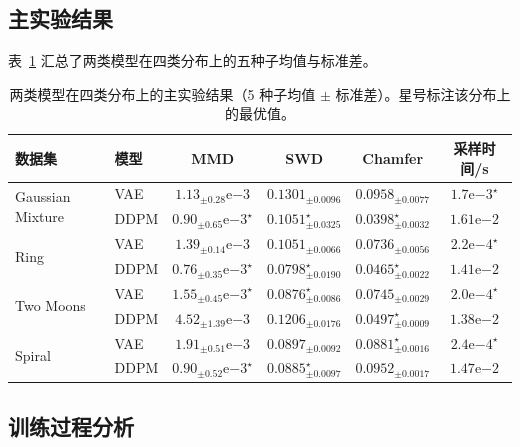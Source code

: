 \documentclass[UTF8,a4paper,12pt]{ctexart}
\begin{document}
\subsection{主实验结果}

表~\ref{tab:main-results} 汇总了两类模型在四类分布上的五种子均值与标准差。

\begin{table}[H]
\centering
\footnotesize
\caption{两类模型在四类分布上的主实验结果（5 种子均值 $\pm$ 标准差）。星号标注该分布上的最优值。}
\label{tab:main-results}
\begin{tabular}{llcccc}
\toprule
数据集 & 模型 & MMD  & SWD  & Chamfer  & 采样时间/s \\
\midrule
\multirow{2}{*}{Gaussian Mixture}
    & VAE    & $1.13_{\pm 0.28}\mathrm{e}{-3}$ & $0.1301_{\pm 0.0096}$ & $0.0958_{\pm 0.0077}$ & $\mathbf{1.7}\mathrm{e}{-3}^\star$ \\
    & DDPM   & $\mathbf{0.90}_{\pm 0.65}\mathrm{e}{-3}^\star$ & $\mathbf{0.1051}_{\pm 0.0325}^\star$ & $\mathbf{0.0398}_{\pm 0.0032}^\star$ & $1.61\mathrm{e}{-2}$ \\
\midrule
\multirow{2}{*}{Ring}
    & VAE    & $1.39_{\pm 0.14}\mathrm{e}{-3}$ & $0.1051_{\pm 0.0066}$ & $0.0736_{\pm 0.0056}$ & $\mathbf{2.2}\mathrm{e}{-4}^\star$ \\
    & DDPM   & $\mathbf{0.76}_{\pm 0.35}\mathrm{e}{-3}^\star$ & $\mathbf{0.0798}_{\pm 0.0190}^\star$ & $\mathbf{0.0465}_{\pm 0.0022}^\star$ & $1.41\mathrm{e}{-2}$ \\
\midrule
\multirow{2}{*}{Two Moons}
    & VAE    & $\mathbf{1.55}_{\pm 0.45}\mathrm{e}{-3}^\star$ & $\mathbf{0.0876}_{\pm 0.0086}^\star$ & $0.0745_{\pm 0.0029}$ & $\mathbf{2.0}\mathrm{e}{-4}^\star$ \\
    & DDPM   & $4.52_{\pm 1.39}\mathrm{e}{-3}$ & $0.1206_{\pm 0.0176}$ & $\mathbf{0.0497}_{\pm 0.0009}^\star$ & $1.38\mathrm{e}{-2}$ \\
\midrule
\multirow{2}{*}{Spiral}
    & VAE    & $1.91_{\pm 0.51}\mathrm{e}{-3}$ & $0.0897_{\pm 0.0092}$ & $\mathbf{0.0881}_{\pm 0.0016}^\star$ & $\mathbf{2.4}\mathrm{e}{-4}^\star$ \\
    & DDPM   & $\mathbf{0.90}_{\pm 0.52}\mathrm{e}{-3}^\star$ & $\mathbf{0.0885}_{\pm 0.0097}^\star$ & $0.0952_{\pm 0.0017}$ & $1.47\mathrm{e}{-2}$ \\
\bottomrule
\end{tabular}
\end{table}

\subsection{训练过程分析}
\end{document}
